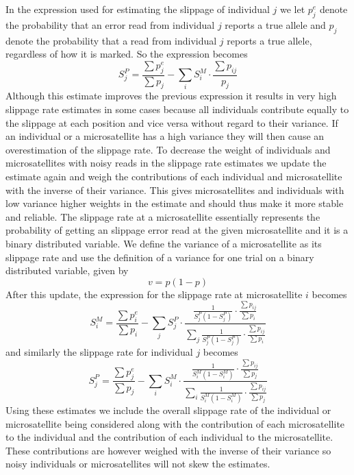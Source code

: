 \documentclass{bioinfo}
\begin{document}
\begin{methods}
\begin{equation}
\label{eq:sMjEq}
\end{equation}
In the expression used for estimating the slippage of individual $j$ we let $p^e_j$ denote the probability that an error read from individual $j$ reports a true allele and $p_j$ denote the probability that a read from individual $j$ reports a true allele, regardless of how it is marked. So the expression becomes
\begin{equation}
S^{P}_j = \frac{\sum p^e_j}{\sum p_j} - 
\sum_i S^{M}_i \cdot \frac{\sum p_{ij}}{p_j}
\label{eq:sPjEq}
\end{equation}
Although this estimate improves the previous expression it results in very high slippage rate estimates in some cases because all individuals contribute equally to the slippage at each position and vice versa without regard to their variance. If an individual or a microsatellite has a high variance they will then cause an overestimation of the slippage rate.
To decrease the weight of individuals and microsatellites with noisy reads in the slippage rate estimates we update the estimate again and weigh the contributions of each individual and microsatellite with the inverse of their variance. This gives microsatellites and individuals with low variance higher weights in the estimate and should thus make it more stable and reliable. 
The slippage rate at a microsatellite essentially represents the probability of getting an slippage error read at the given microsatellite and it is a binary distributed variable. We define the variance of a microsatellite as its slippage rate and use the definition of a variance for one trial on a binary distributed variable, given by
\begin{equation}
v = p(1-p)
\end{equation}
After this update, the expression for the slippage rate at microsatellite $i$ becomes 
\begin{equation}
S^{M}_i = \frac{\sum p^e_i}{\sum p_i} - 
\sum_j S^{P}_j \cdot 
\frac{ \frac{1}{S^{P}_j(1-S^{P}_j)} \cdot \frac{\sum p_{ij}}{\sum p_i}}{\sum_j \frac{1}{S^{P}_j(1-S^{P}_j)} \cdot \frac{\sum p_{ij}}{\sum p_i}}
\label{eq:sMiEq2}
\end{equation}
and similarly the slippage rate for individual $j$ becomes 
\begin{equation}
S^{P}_j = \frac{\sum p^e_j}{\sum p_j} - 
\sum_i S^{M}_i \cdot
\frac{ \frac{1}{S^{M}_i(1-S^{M}_i)} \cdot \frac{\sum p_{ij}}{\sum p_j}}
{\sum_i \frac{1}{S^{M}_i(1-S^{M}_i)} \cdot \frac{\sum p_{ij}}{\sum p_j}}
\label{eq:sPjEq2}
\end{equation}
Using these estimates we include the overall slippage rate of the individual or microsatellite being considered along with the contribution of each microsatellite to the individual and the contribution of each individual to the microsatellite. These contributions are however weighed with the inverse of their variance so noisy individuals or microsatellites will not skew the estimates.
\end{methods}
\end{document}

